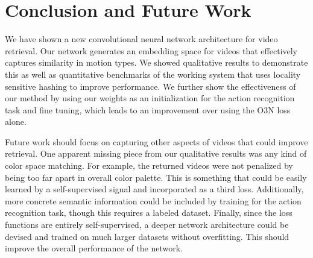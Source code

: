 \section{Conclusion and Future Work}\label{sec:conclusion}

We have shown a new convolutional neural network architecture for video retrieval. Our network generates an embedding space for videos that effectively captures similarity in motion types. We showed qualitative results to demonstrate this as well as quantitative benchmarks of the working system that uses locality sensitive hashing to improve performance.  We further show the effectiveness of our method by using our weights as an initialization for the action recognition task and fine tuning, which leads to an improvement over using the O3N loss alone.

Future work should focus on capturing other aspects of videos that could improve retrieval. One apparent missing piece from our qualitative results was any kind of color space matching. For example, the returned videos were not penalized by being too far apart in overall color palette. This is something that could be easily learned by a self-supervised signal and incorporated as a third loss. Additionally, more concrete semantic information could be included by training for the action recognition task, though this requires a labeled dataset. Finally, since the loss functions are entirely self-supervised, a deeper network architecture could be devised and trained on much larger datasets without overfitting. This should improve the overall performance of the network.